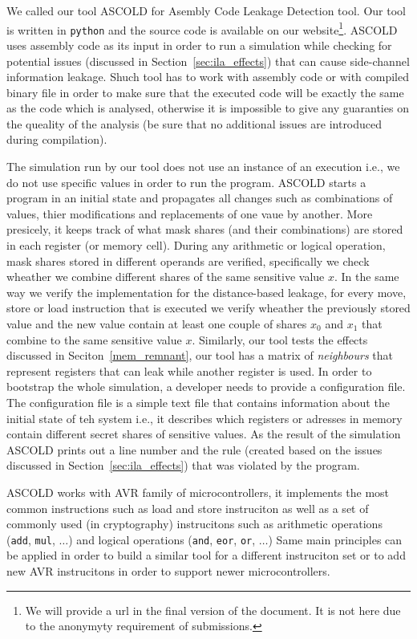 We called our tool ASCOLD for Asembly Code Leakage Detection tool.
Our tool is written in \texttt{python} and the source code is available on our 
website\footnote{We will provide a url in the final version of the document. 
It is not here due to the anonymyty requirement of submissions.}.
ASCOLD uses assembly code as its input in order to run a simulation while checking for potential
issues (discussed in Section~\ref{sec:ila_effects}) that can cause side-channel information leakage.
Shuch tool has to work with assembly code or with compiled binary file
in order to make sure that the executed code will be exactly the same as the code
which is analysed, otherwise it is impossible to give any guaranties
on the queality of the analysis 
(be sure that no additional issues are introduced during compilation).

The simulation run by our tool does not use an instance of an execution i.e.,
we do not use specific values in order to run the program.
ASCOLD starts a program in an initial state and propagates all changes
such as combinations of values, thier modifications and replacements
of one vaue by another. More presicely, it keeps track of what mask shares
(and their combinations) are stored in each register (or memory cell).
During any arithmetic or logical operation, mask shares stored in different operands
are verified, specifically we check wheather we combine different shares of the same sensitive value $x$.
In the same way we verify the implementation for the distance-based leakage,
for every move, store or load instruction that is executed we verify wheather
the previously stored value and the new value contain at least one couple of shares $x_0$ and $x_1$ that combine to the same sensitive value $x$. Similarly, our tool tests the effects discussed in Seciton~\ref{mem_remnant},
our tool has a matrix of \emph{neighbours} that represent registers that can leak while another register is used.
In order to bootstrap the whole simulation, a developer needs to provide
a configuration file. The configuration file is a simple text file that contains information about the initial
state of teh system i.e., it describes which registers or adresses in memory contain different secret shares of sensitive values.
As the result of the simulation ASCOLD prints out a line number and the rule 
(created based on the issues discussed in Section~\ref{sec:ila_effects}) that was violated
by the program.

ASCOLD works with AVR family of microcontrollers, 
it implements the most common instructions such as load and store instruciton
as well as a set of commonly used (in cryptography) instrucitons such as arithmetic operations
(\texttt{add}, \texttt{mul}, $\dots$) and logical operations (\texttt{and}, \texttt{eor}, \texttt{or}, $\dots$)
Same main principles can be applied
in order to build a similar tool for a different instruciton set or to add 
new AVR instrucitons in order to support newer microcontrollers.

